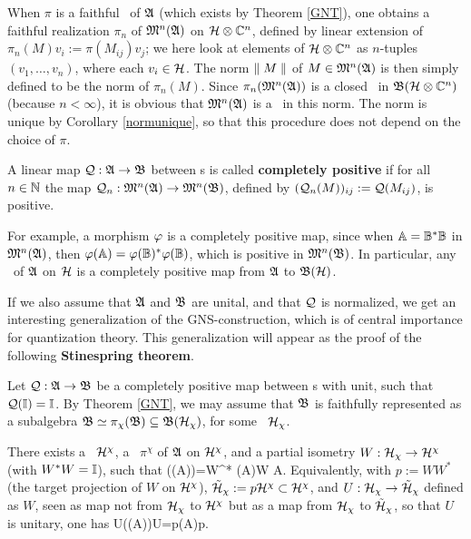 When $\pi$ is a faithful \rep\ of ${\frak A}$ (which exists by Theorem
\ref{GNT}), one obtains a faithful realization $\pi_n$ of ${\frak M}^n({\frak A})$
on ${\cal H}\otimes{\Bbb C}^n$, defined by linear extension of
$\pi_n(M)v_i:=\pi(M_{ij})v_j$; we here look at elements of ${\cal H}\otimes{\Bbb C}^n$
as $n$-tuples $(v_1,\ldots,v_n)$, where each $v_i\in{\cal H}$.  The norm $\parallel
M\parallel$ of $M\in{\frak M}^n({\frak A})$ is then simply defined to be the norm of
$\pi_n(M)$.  Since $\pi_n({\frak M}^n({\frak A}))$ is a closed \sta\ in
${\frak B}({\cal H}\otimes{\Bbb C}^n)$ (because $n<\infty$), it is obvious that ${\frak M}^n({\frak A})$ is
a \ca\ in this norm. The norm is unique by Corollary \ref{normunique},
so that this procedure does not depend on the choice of $\pi$.
\begin{Definition}
 A linear map ${\cal Q}:{\frak A}\rightarrow {\frak B}$ between \ca s is called {\bf completely
positive} if for all $n\in \Bbb N$ the map ${\cal Q}_n: {\frak M}^n({\frak A})\rightarrow
{\frak M}^n({\frak B})$, defined by $({\cal Q}_n(M))_{ij}:= {\cal Q}(M_{ij})$, is positive.
\end{Definition}

For example, a morphism $\varphi$ is a completely positive map, since
when $\Bbb A=\Bbb B^*\Bbb B$ in ${\frak M}^n({\frak A})$, then $\varphi(\Bbb
A)=\varphi(\Bbb B)^*\varphi(\Bbb B)$, which is positive in ${\frak M}^n({\frak B})$.  In
particular, any \rep\ of ${\frak A}$ on ${\cal H}$ is a completely positive map
from ${\frak A}$ to ${\frak B}({\cal H})$.

 If we also assume that ${\frak A}$ and ${\frak B}$ are unital, and that ${\cal Q}$ is
normalized, we get an interesting generalization of the
GNS-construction, which is of central importance for quantization
theory. This generalization will appear as the proof of the following
{\bf Stinespring theorem}.
\begin{Theorem}
Let ${\cal Q}:{\frak A}\rightarrow {\frak B}$ be a completely positive map between \ca s with
unit, such that ${\cal Q}({\Bbb I})={\Bbb I}$.  By Theorem \ref{GNT}, we may assume
that ${\frak B}$ is faithfully represented as a subalgebra ${\frak B}\simeq
\pi_{\chi}({\frak B})\subseteq {\frak B}({\cal H}_{\chi})$, for some \Hs\ ${\cal H}_{\chi}$.

There exists a \Hs\ ${\cal H}^{\chi}$, a \rep\ $\pi^{\chi}$ of ${\frak A}$ on
${\cal H}^{\chi}$, and a partial isometry $W:{\cal H}_{\chi} \rightarrow {\cal H}^{\chi}$ (with $W^*W={\Bbb I}$),
such that \be \plg(\CQ(A))=W^* \pug(A)W \:\:\: \forall
A\in\A.  \ee Equivalently, with $p:=WW^*$ (the target
projection of $W$ on ${\cal H}^{\chi}$), $\tilde{{\cal H}}_{\chi}:=p{\cal H}^{\chi}\subset {\cal H}^{\chi}$, and
$U:{\cal H}_{\chi}\rightarrow \tilde{{\cal H}}_{\chi}$ defined as $W$, seen as map not from
${\cal H}_{\chi}$ to ${\cal H}^{\chi}$ but as a map from ${\cal H}_{\chi}$ to $\tilde{{\cal H}}_{\chi}$, so that
$U$ is unitary, one has \be U\plg(\CQ(A))U\inv=p\pug(A)p.
\ee
\end{Theorem}

